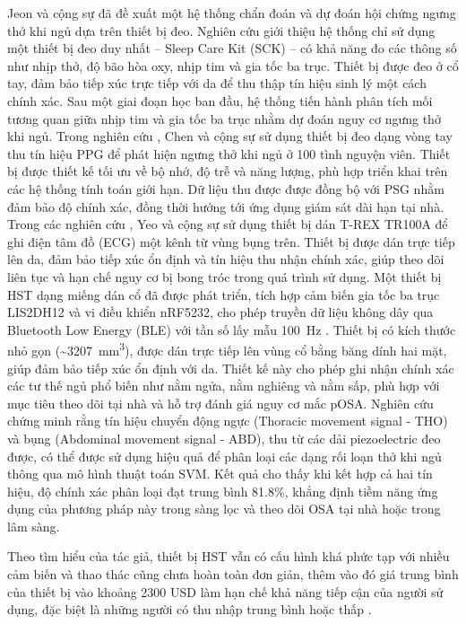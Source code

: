Jeon và cộng sự \cite{jeon2020realtime} đã đề xuất một hệ thống chẩn đoán và 
dự đoán hội chứng ngưng thở khi ngủ dựa trên thiết bị đeo. 
Nghiên cứu giới thiệu hệ thống chỉ sử dụng một thiết bị đeo duy nhất – Sleep Care Kit (SCK) – 
có khả năng đo các thông số như nhịp thở, độ bão hòa oxy, nhịp tim và gia tốc ba trục. 
Thiết bị được đeo ở cổ tay, đảm bảo tiếp xúc trực tiếp với da để thu thập tín hiệu sinh lý một cách chính xác. 
Sau một giai đoạn học ban đầu, hệ thống tiến hành phân tích mối tương quan giữa nhịp tim và gia tốc ba trục 
nhằm dự đoán nguy cơ ngưng thở khi ngủ.
Trong nghiên cứu \cite{chen2024hdc}, Chen và cộng sự sử dụng thiết bị đeo dạng 
vòng tay thu tín hiệu PPG để phát hiện ngưng thở khi ngủ ở 100 tình nguyện viên. 
Thiết bị được thiết kế tối ưu về bộ nhớ, độ trễ và năng lượng, phù hợp triển khai 
trên các hệ thống tính toán giới hạn. Dữ liệu thu được được đồng bộ với PSG 
nhằm đảm bảo độ chính xác, đồng thời hướng tới ứng dụng giám sát dài hạn tại nhà.
Trong các nghiên cứu \cite{yeo2022resnet, yeo2022respiratory}, Yeo và cộng sự sử dụng thiết bị dán T-REX TR100A 
để ghi điện tâm đồ (ECG) một kênh từ vùng bụng trên. Thiết bị được dán trực tiếp lên da, 
đảm bảo tiếp xúc ổn định và tín hiệu thu nhận chính xác, giúp theo dõi liên tục và 
hạn chế nguy cơ bị bong tróc trong quá trình sử dụng.
Một thiết bị HST dạng miếng dán cổ đã được phát triển, tích hợp cảm biến 
gia tốc ba trục LIS2DH12 và vi điều khiển nRF5232, 
cho phép truyền dữ liệu không dây qua Bluetooth Low Energy (BLE) 
với tần số lấy mẫu 100~Hz \cite{Sleep_Posture_Detection}. Thiết bị có kích thước nhỏ gọn 
(\textasciitilde3207~mm\textsuperscript{3}), được dán trực tiếp lên vùng 
cổ bằng băng dính hai mặt, giúp đảm bảo tiếp xúc ổn định với da. 
Thiết kế này cho phép ghi nhận chính xác các tư thế ngủ phổ biến như nằm ngửa, 
nằm nghiêng và nằm sấp, phù hợp với mục tiêu theo dõi tại nhà và hỗ trợ đánh giá nguy cơ mắc pOSA.
Nghiên cứu\cite{svmHSt2017} chứng minh rằng tín hiệu chuyển động ngực (Thoracic movement signal - THO) và bụng (Abdominal movement signal - ABD), 
thu từ các dải piezoelectric đeo được, có thể được sử dụng hiệu quả để phân loại các dạng rối loạn thở khi ngủ thông qua mô hình 
thuật toán SVM. Kết quả cho thấy khi kết hợp cả hai tín hiệu, độ chính xác phân loại đạt trung bình 81.8\%, 
khẳng định tiềm năng ứng dụng của phương pháp này trong sàng lọc và theo dõi OSA tại nhà hoặc trong lâm sàng.

Theo tìm hiểu của tác giả, thiết bị HST vẫn có cấu hình khá phức tạp với nhiều cảm biến và thao thác 
cũng chưa hoàn toàn đơn giản, thêm vào đó giá trung bình của thiết bị vào khoảng 2300 USD làm hạn chế khả năng tiếp 
cận của người sử dụng, đặc biệt là những người có thu nhập trung bình hoặc thấp \cite{hst_review}. 

